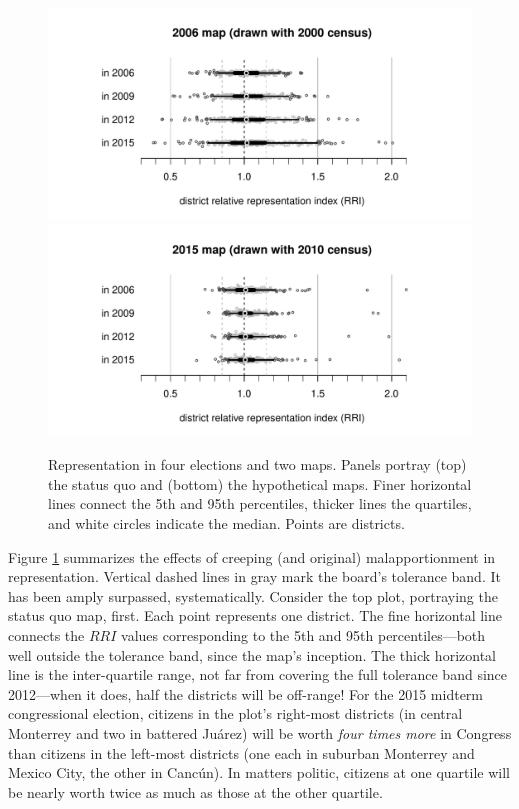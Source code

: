 \documentclass[letter,12pt]{article}
\begin{document}
\begin{figure}
\begin{center}
    \includegraphics[width=.65\columnwidth]{rrin0615d0.pdf} \\
    \includegraphics[width=.65\columnwidth]{rrin0615d3.pdf} \\
\caption{Representation in four elections and two maps. Panels portray (top) the status quo and (bottom) the hypothetical maps. Finer horizontal lines connect the 5th and 95th percentiles, thicker lines the quartiles, and white circles indicate the median. Points are districts.}\label{F:malapp}
\end{center}
\end{figure}

Figure \ref{F:malapp} summarizes the effects of creeping (and original) malapportionment in representation. Vertical dashed lines in gray mark the board's tolerance band. It has been amply surpassed, systematically. Consider the top plot, portraying the status quo map, first. Each point represents one district. The fine horizontal line connects the $RRI$ values corresponding to the 5th and 95th percentiles---both well outside the tolerance band, since the map's inception. The thick horizontal line is the inter-quartile range, not far from covering the full tolerance band since 2012---when it does, half the districts will be off-range! For the 2015 midterm congressional election, citizens in the plot's right-most districts (in central Monterrey and two in battered Ju\'arez) will be worth \emph{four times more} in Congress than citizens in the left-most districts (one each in suburban Monterrey and Mexico City, the other in Canc\'un). In matters politic, citizens at one quartile will be nearly worth twice as much as those at the other quartile. 
\end{document}
